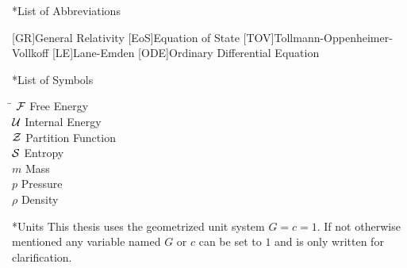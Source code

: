 \begin{section}*{List of Abbreviations}

\begin{acronym}[TOV]
	[GR]{General Relativity}
	[EoS]{Equation of State}
	[TOV]{Tollmann-Oppenheimer-Vollkoff}
	[LE]{Lane-Emden}
	[ODE]{Ordinary Differential Equation}
\end{acronym}


\end{section}
\begin{section}*{List of Symbols}
\begin{tabbing}
\hspace{2cm}\=\kill
$\mathcal{F}$				\> Free Energy\\
$\mathcal{U}$				\> Internal Energy\\
$\mathcal{Z}$				\> Partition Function\\
$\mathcal{S}$				\> Entropy\\
$m$					\> Mass\\
$p$					\> Pressure\\
$\rho$				\> Density
\end{tabbing}

\end{section}

\begin{section}*{Units}
This thesis uses the geometrized unit system $G=c=1$.
If not otherwise mentioned any variable named $G$ or $c$ can be set to $1$ and is only written for clarification.
\end{section}
